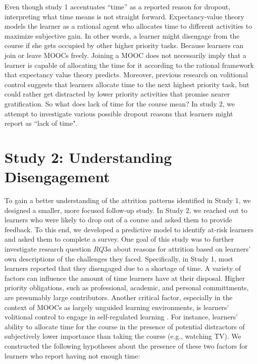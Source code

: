 \documentclass{sigchi}\usepackage[]{graphicx}\usepackage[]{color}
\begin{document}
Even though study 1 accentuates ``time'' as a reported reason for dropout, interpreting what time means is not straight forward. Expectancy-value theory models the learner as a rational agent who allocates time to different activities to maximize subjective gain. In other words, a learner might disengage from the course if she gets occupied by other higher priority tasks. Because learners can join or leave MOOCs freely. Joining a MOOC does not necessarily imply that a learner is capable of allocating the time for it according to the rational framework that expectancy value theory predicts. Moreover, previous research on volitional control suggests that learners allocate time to the next highest priority task, but could rather get distracted by lower priority activities that promise nearer gratification. So what does lack of time for the course mean? In study 2, we attempt to investigate various possible dropout reasons that learners might report as ``lack of time".


\section{Study 2: Understanding Disengagement}

To gain a better understanding of the attrition patterns identified in Study 1, we designed a smaller, more focused follow-up study. In Study 2, we reached out to learners who were likely to drop out of a course and asked them to provide feedback. To this end, we developed a predictive model to identify at-risk learners and asked them to complete a survey. One goal of this study was to further investigate research question $RQ3a$ about reasons for attrition based on learners' own descriptions of the challenges they faced. Specifically, in Study 1, most learners reported that they disengaged due to a shortage of time. A variety of factors can influence the amount of time learners have at their disposal. Higher priority obligations, such as professional, academic, and personal committments, are presumably large contributors. Another critical factor, especially in the context of MOOCs as largely unguided learning environments, is learners' volitional control to engage in self-regulated learning \cite{corno2001volitional}. For instance, learners' ability to allocate time for the course in the presence of potential distractors of subjectively lower importance than taking the course (e.g., watching TV). We constructed the following hypotheses about the presence of these two factors for learners who report having not enough time:
\end{document}
